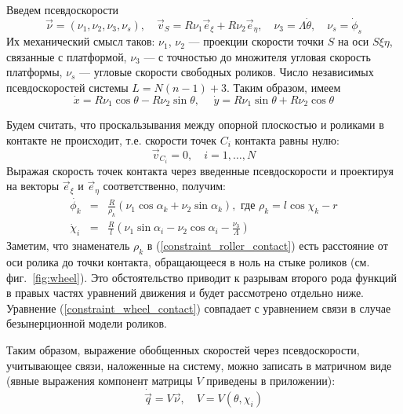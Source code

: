 Введем псевдоскорости
$$\vec{\nu} = (\nu_1, \nu_2, \nu_3, \nu_s), \quad \vec{v}_S = R\nu_1\vec{e}_\xi + R\nu_2\vec{e}_\eta, \quad \nu_3 = \Lambda\dot{\theta},\quad \nu_s = \dot{\phi}_s$$
Их механический смысл таков: $\nu_1$, $\nu_2$ --- проекции скорости точки $S$ на оси $S\xi\eta$, связанные с платформой, $\nu_3$ --- с точностью до множителя угловая скорость платформы, $\nu_s$ --- угловые скорости свободных роликов. Число независимых псевдоскоростей системы $L = N(n-1)+3$. Таким образом, имеем
$$ \dot{x} = R \nu_1\cos\theta-R\nu_2\sin\theta, \hspace{15pt} \dot{y} = R\nu_1\sin\theta+R\nu_2\cos\theta$$

Будем считать, что проскальзывания между опорной плоскостью и роликами в контакте не происходит, т.е.
скорости точек $C_i$ контакта равны нулю:
$$\vec{v}_{C_i} = 0,\quad i = 1,\dots, N$$
Выражая скорость точек контакта через введенные псевдоскорости и проектируя на векторы $\vec{e}_\xi$ и $\vec{e}_\eta$ соответственно, получим:
\begin{eqnarray}
\dot{\phi_k} &=& \frac{R}{\rho_k }(\nu_1\cos\alpha_k + \nu_2\sin\alpha_k),\text{ где } \rho_k  = l\cos\chi_k - r \label{constraint_roller_contact}\\
\dot{\chi}_i &=& \frac{R}{l}(\nu_1\sin\alpha_i - \nu_2\cos\alpha_i - \frac{\nu_3}{\Lambda})\label{constraint_wheel_contact}
\end{eqnarray}
Заметим, что знаменатель $\rho_k$ в (\ref{constraint_roller_contact}) есть расстояние от оси ролика до точки контакта, обращающееся в ноль на стыке роликов (см. фиг.~\ref{fig:wheel}). Это обстоятельство приводит к разрывам второго рода функций в правых частях уравнений движения и будет рассмотрено отдельно ниже.
Уравнение (\ref{constraint_wheel_contact}) совпадает с уравнением связи в случае безынерционной модели роликов. 

Таким образом, выражение обобщенных скоростей через псевдоскорости, учитывающее связи, наложенные на систему, можно записать в матричном виде (явные выражения компонент матрицы $V$ приведены в приложении):
\begin{equation}\label{constraints_V}
    \dot{\vec{q}} = V\vec{\nu},\quad V = V(\theta,\chi_i)
\end{equation}

